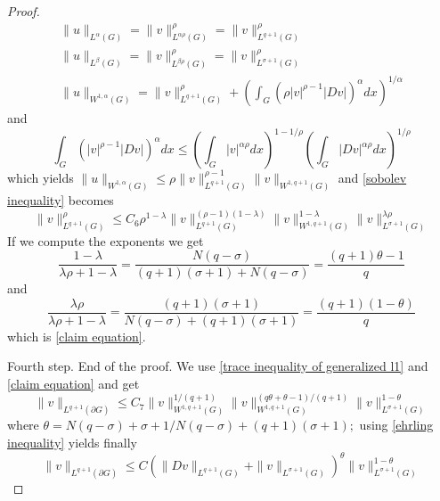 \begin{proof}
\begin{equation*}
\begin{array}{c}
		\|u\|_{L^{\alpha}(G)}=\|v\|_{L^{\alpha \rho}(G)}^{\rho}=\|v\|_{L^{q+1}(G)}^{\rho} \\
		\|u\|_{L^{\beta}(G)}=\|v\|_{L^{\beta \rho}(G)}^{\rho}=\|v\|_{L^{\sigma+1}(G)}^{\rho} \\
		\|u\|_{W^{1, \alpha}(G)}=\|v\|_{L^{q+1}(G)}^{\rho}+\left(\int_{G}\left(\rho|v|^{\rho-1}|D v|\right)^{\alpha} d x\right)^{1 / \alpha}
	\end{array}
\end{equation*}
and
\begin{equation*}
	\int_{G}\left(|v|^{\rho-1}|D v|\right)^{\alpha} d x \leq\left(\int_{G}|v|^{\alpha \rho} d x\right)^{1-1 / \rho}\left(\int_{G}|D v|^{\alpha \rho} d x\right)^{1 / \rho}
\end{equation*}
which yields $\|u\|_{W^{1, \alpha}(G)} \leq \rho\|v\|_{L^{q+1}(G)}^{\rho-1}\|v\|_{W^{1, q+1}(G)}$ and \eqref{sobolev inequality} becomes
\begin{equation}
	\|v\|_{L^{q+1}(G)}^{\rho} \leq C_{6} \rho^{1-\lambda}\|v\|_{L^{q+1}(G)}^{(\rho-1)(1-\lambda)}\|v\|_{W^{1, q+1}(G)}^{1-\lambda}\|v\|_{L^{\sigma +1}(G)}^{\lambda \rho}
\end{equation}
If we compute the exponents we get
\begin{equation*}
	\frac{1-\lambda}{\lambda \rho+1-\lambda}=\frac{N(q-\sigma)}{(q+1)(\sigma+1)+N(q-\sigma)}=\frac{(q+1) \theta-1}{q}
\end{equation*}
and
\begin{equation*}
	\frac{\lambda \rho}{\lambda \rho+1-\lambda}=\frac{(q+1)(\sigma+1)}{N(q-\sigma)+(q+1)(\sigma+1)}=\frac{(q+1)(1-\theta)}{q}
\end{equation*}
which is \eqref{claim equation}.

Fourth step. End of the proof. We use \eqref{trace inequality of generalized l1} and \eqref{claim equation} and get
\begin{equation}
\|v\|_{L^{q+1}(\partial G)} \leq C_{7}\|v\|_{W^{1, q+1}(G)}^{1 /(q+1)}\|v\|_{W^{1, q+1}(G)}^{(q \theta+\theta-1) /(q+1)}\|v\|_{L^{\sigma+1}(G)}^{1-\theta}
\end{equation}
where $\theta=N(q-\sigma)+\sigma+1 / N(q-\sigma)+(q+1)(\sigma+1) ;$ using \eqref{ehrling inequality} yields finally 
\begin{equation}
\|v\|_{L^{q+1}(\partial G)} \leq C\left(\|D v\|_{L^{q+1}(G)}+\|v\|_{L^{\sigma+1}(G)}\right)^{\theta}\|v\|_{L^{\sigma+1}(G)}^{1-\theta}
\end{equation}
\end{proof}

